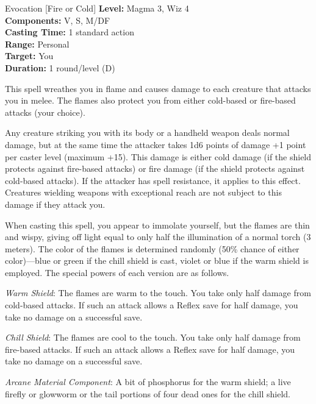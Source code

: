 {Evocation [Fire or Cold]}
{
	\textbf{Level:}
	Magma 3, Wiz 4\\
	\textbf{Components:}
	V, S, M/DF\\
	\textbf{Casting Time:}
	1 standard action\\
	\textbf{Range:}
	Personal\\
	\textbf{Target:}
	You\\
	\textbf{Duration:}
	1 round/level (D)\\
}
{
	This spell wreathes you in flame and causes damage to each creature that attacks you in melee. The flames also protect you from either cold-based or fire-based attacks (your choice).

	Any creature striking you with its body or a handheld weapon deals normal damage, but at the same time the attacker takes 1d6 points of damage +1 point per caster level (maximum +15). This damage is either cold damage (if the shield protects against fire-based attacks) or fire damage (if the shield protects against cold-based attacks). If the attacker has spell resistance, it applies to this effect. Creatures wielding weapons with exceptional reach are not subject to this damage if they attack you.

	When casting this spell, you appear to immolate yourself, but the flames are thin and wispy, giving off light equal to only half the illumination of a normal torch (3 meters). The color of the flames is determined randomly (50\% chance of either color)---blue or green if the chill shield is cast, violet or blue if the warm shield is employed. The special powers of each version are as follows.

	\textit{Warm Shield}:
	The flames are warm to the touch. You take only half damage from cold-based attacks. If such an attack allows a Reflex save for half damage, you take no damage on a successful save.

	\textit{Chill Shield}:
	The flames are cool to the touch. You take only half damage from fire-based attacks. If such an attack allows a Reflex save for half damage, you take no damage on a successful save.

	\textit{Arcane Material Component}:
	A bit of phosphorus for the warm shield; a live firefly or glowworm or the tail portions of four dead ones for the chill shield.

}
